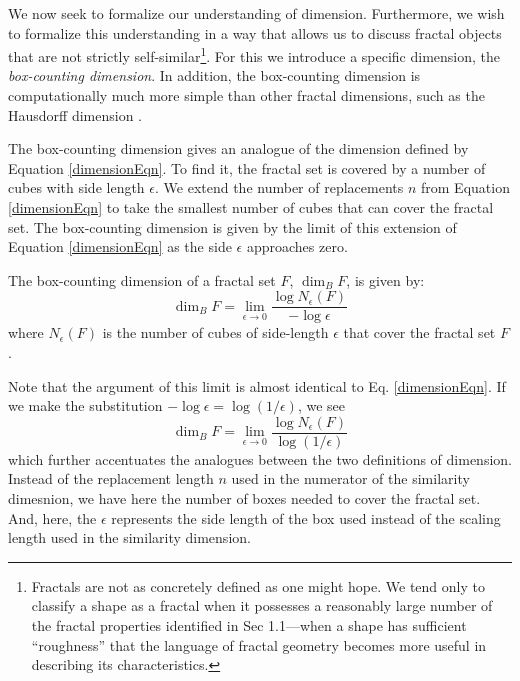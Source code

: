 We now seek to formalize our understanding of dimension. Furthermore, we wish to formalize this understanding in a way that allows us to discuss fractal objects that are not strictly self-similar\footnote{Fractals are not as concretely defined as one might hope. We tend only to classify a shape as a fractal when it possesses a reasonably large number of the fractal properties identified in Sec 1.1---when a shape has sufficient ``roughness'' that the language of fractal geometry becomes more useful in describing its characteristics.}. For this we introduce a specific dimension, the \textit{box-counting dimension}. In addition, the box-counting dimension is computationally much more simple than other fractal dimensions, such as the Hausdorff dimension \citep{fractaltextbook}.

The box-counting dimension gives an analogue of the dimension defined by Equation \ref{dimensionEqn}. To find it, the fractal set is covered by a number of cubes with side length $\epsilon$. We extend the number of replacements $ n $ from Equation \ref{dimensionEqn} to take the smallest number of cubes that can cover the fractal set. The box-counting dimension is given by the limit of this extension of Equation \ref{dimensionEqn} as the side $\epsilon$ approaches zero.

\begin{mydef} The box-counting dimension of a fractal set $ F $, $\operatorname{dim}_B F $, is given by:
\begin{equation}\label{boxcountingeqn}\operatorname{dim}_B F = \lim_{\epsilon \to 0} \frac{\log N_\epsilon(F)}{-\log\epsilon}
\end{equation}
where $N_\epsilon(F)$ is the number of cubes of side-length $\epsilon$ that cover the fractal set $F$.
\end{mydef}

Note that the argument of this limit is almost identical to Eq. \ref{dimensionEqn}. If we make the substitution $-\log \epsilon = \log(1/\epsilon)$, we see
\begin{equation}\label{boxcountingeqn2}\operatorname{dim}_B F = \lim_{\epsilon \to 0} \frac{\log N_\epsilon(F)}{\log(1/\epsilon)}
\end{equation}
which further accentuates the analogues between the two definitions of dimension. Instead of the replacement length $n$ used in the numerator of the similarity dimesnion, we have here the number of boxes needed to cover the fractal set. And, here, the $\epsilon$ represents the side length of the box used instead of the scaling length used in the similarity dimension.

